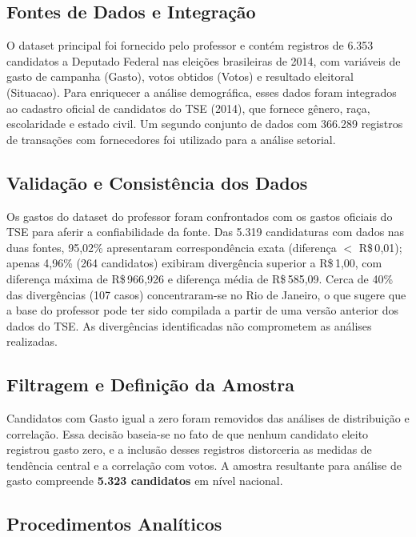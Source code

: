 \documentclass[conference]{IEEEtran}
\begin{document}
\subsection{Fontes de Dados e Integração}

O dataset principal foi fornecido pelo professor e contém registros de 6.353
candidatos a Deputado Federal nas eleições brasileiras de 2014, com variáveis
de gasto de campanha (Gasto), votos obtidos (Votos) e resultado eleitoral
(Situacao). Para enriquecer a análise demográfica, esses dados foram integrados
ao cadastro oficial de candidatos do TSE (2014), que fornece gênero, raça,
escolaridade e estado civil. Um segundo conjunto de dados com 366.289 registros
de transações com fornecedores foi utilizado para a análise setorial.

\subsection{Validação e Consistência dos Dados}

Os gastos do dataset do professor foram confrontados com os gastos oficiais do
TSE para aferir a confiabilidade da fonte. Das 5.319 candidaturas com dados
nas duas fontes, 95{,}02\% apresentaram correspondência exata (diferença
$<$ R\$\,0{,}01); apenas 4{,}96\% (264 candidatos) exibiram divergência
superior a R\$\,1{,}00, com diferença máxima de R\$\,966{,}926 e diferença
média de R\$\,585{,}09. Cerca de 40\% das divergências (107 casos) concentraram-se
no Rio de Janeiro, o que sugere que a base do professor pode ter sido compilada a
partir de uma versão anterior dos dados do TSE. As divergências identificadas não
comprometem as análises realizadas.

\subsection{Filtragem e Definição da Amostra}

Candidatos com Gasto igual a zero foram removidos das análises de distribuição
e correlação. Essa decisão baseia-se no fato de que nenhum candidato eleito
registrou gasto zero, e a inclusão desses registros distorceria as medidas de
tendência central e a correlação com votos. A amostra resultante para análise
de gasto compreende \textbf{5.323 candidatos} em nível nacional.

\subsection{Procedimentos Analíticos}
\end{document}
